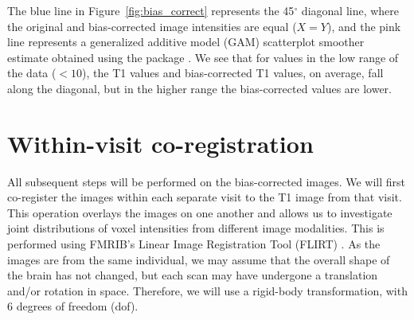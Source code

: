 


The blue line in Figure~\ref{fig:bias_correct}\protect{} represents the 45$^{\circ}$ diagonal line, where the original and bias-corrected image intensities are equal ($X = Y$), and the pink line represents a generalized additive model (GAM) \citep{hastie_generalized_1990} scatterplot smoother estimate obtained using the  package \citep{wood_fast_2011}.  We see that for values in the low range of the data ($< 10$), the T1 values and bias-corrected T1 values, on average, fall along the diagonal, but in the higher range the bias-corrected values are lower.






\section{Within-visit co-registration}
All subsequent steps will be performed on the bias-corrected images.  We will first co-register the images within each separate visit to the T1 image from that visit.  This operation overlays the images on one another and allows us to investigate joint distributions of voxel intensities from different image modalities.  This is performed using FMRIB's Linear Image Registration Tool (FLIRT) \citep{jenkinson_global_2001, jenkinson_improved_2002}.  As the images are from the same individual, we may assume that the overall shape of the brain has not changed, but each scan may have undergone a translation and/or rotation in space.  Therefore, we will use a rigid-body transformation, with $6$ degrees of freedom (dof).  







